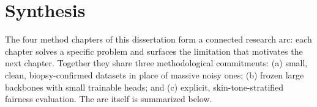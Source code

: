 \documentclass[11pt]{ucthesis}
\begin{document}
\section{Synthesis}
\label{sec:bg_position}

The four method chapters of this dissertation form a connected research arc: each chapter solves a specific problem and surfaces the limitation that motivates the next chapter. Together they share three methodological commitments: (a) small, clean, biopsy-confirmed datasets in place of massive noisy ones; (b) frozen large backbones with small trainable heads; and (c) explicit, skin-tone-stratified fairness evaluation. The arc itself is summarized below.
\end{document}
